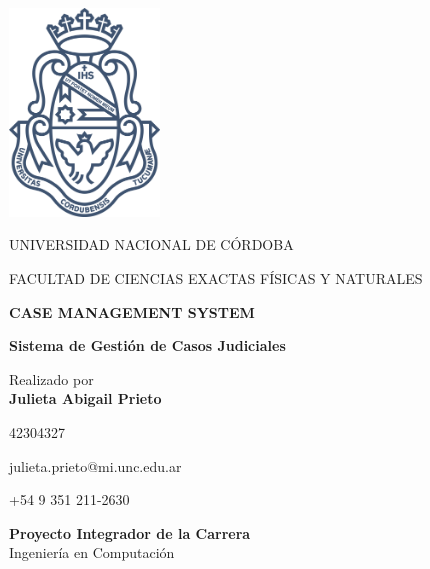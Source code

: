 \begin{center}

\includegraphics[width=0.3\textwidth]{fig/logoUNC.png}

\vspace*{1cm}
\begin{large}
UNIVERSIDAD NACIONAL DE CÓRDOBA 

FACULTAD DE CIENCIAS EXACTAS FÍSICAS Y NATURALES
\end{large}


\vspace*{0.1in}
\AddToShipoutPictureBG*{\AtPageLowerLeft{%
  \color{US_red!20}\rule{.25\paperwidth}{\paperheight}}}


\textbf{\huge CASE MANAGEMENT SYSTEM}

{\Large \textbf{Sistema de Gestión de Casos Judiciales}}
        

\vspace*{.2in}

{\large Realizado por}\\
\textbf{\Large Julieta Abigail Prieto}\\
\vspace*{0.15in}

\begin{description}\centering
    \item[\large Matrícula] \large 42304327
    \item[\large Mail] \large julieta.prieto@mi.unc.edu.ar
    \item[\large Contacto] \large +54 9 351 211-2630
\end{description}


\vspace*{1cm}
\begin{mdframed}[style=US_style]
\centering
\textbf{Proyecto Integrador de la Carrera}\\
{\large Ingeniería en Computación} 


\end{mdframed}
\end{center}
